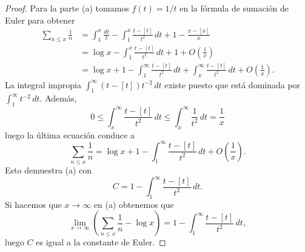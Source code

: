 \documentclass[12pt,a4paper]{book}
\begin{document}
    \begin{proof}
        Para la parte (a) tomamos $f(t)=1/t$ en la fórmula de sumación de Euler para
        obtener
        \begin{align*}
            \sum_{n\leq x}\frac{1}{n}&=\int_{1}^{x}\frac{dt}{t}-\int_{1}^{x}\frac{t-[t]}{t^{2}}\,dt
            +1-\frac{x-[x]}{x}\\
            &=\log x-\int_{1}^{x}\frac{t-[t]}{t^{2}}\,dt+1+O\left(\frac{1}{x}\right)\\
            &=\log x+1-\int_{1}^{\infty}\frac{t-[t]}{t^{2}}\,dt+\int_{x}^{\infty}\frac{t-[t]}{t^{2}}\,dt
            +O\left(\frac{1}{x}\right).
        \end{align*}
        La integral impropia $\int_{1}^{\infty}(t-[t])t^{-2}\,dt$ existe puesto que está
        dominada por $\int_{1}^{\infty} t^{-2}\,dt$. Además,
        \begin{equation*}
            0\leq\int_{x}^{\infty}\frac{t-[t]}{t^{2}}\,dt\leq\int_{x}^{\infty}\frac{1}{t^{2}}\,dt=\frac{1}{x}
        \end{equation*}
        luego la última ecuación conduce a
        \begin{equation*}
            \sum_{n\leq x}\frac{1}{n}=\log x+1-\int_{1}^{\infty}\frac{t-[t]}{t^{2}}\,dt
            +O\left(\frac{1}{x}\right).
        \end{equation*}
        Esto demuestra (a) con
        \begin{equation*}
            C=1-\int_{1}^{\infty}\frac{t-[t]}{t^{2}}\,dt.
        \end{equation*}
        Si hacemos que $x\to\infty$ en (a) obtenemos que
        \begin{equation*}
            \lim_{x\to\infty}\left(\sum_{n\leq x}\frac{1}{n}-\log x\right)
            =1-\int_{1}^{\infty}\frac{t-[t]}{t^{2}}\,dt,
        \end{equation*}
        luego $C$ es igual a la constante de Euler.


\end{proof}
\end{document}
